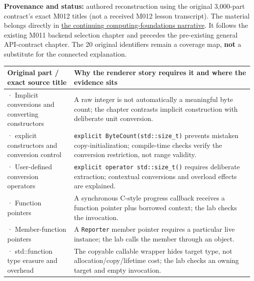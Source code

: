 \textbf{Provenance and status:} authored reconstruction using the original 3,000-part contract's exact M012 titles (not a received M012 lesson transcript). The material belongs directly in \hyperref[01-foundations-i-ch004-from-an-accepted-render-request-to-a-resource-that-survives-failures-and-callbacks]{the continuing computing-foundations narrative}. It follows the existing M011 backend selection chapter and precedes the pre-existing general API-contract chapter. The 20 original identifiers remain a coverage map, \textbf{not} a substitute for the connected explanation.

{\def\LTcaptype{none} %
\begin{longtable}[]{@{}
  >{\raggedright\arraybackslash}p{}
  >{\raggedright\arraybackslash}p{}@{}}
\toprule\noalign{}
\begin{minipage}[b]{\linewidth}\raggedright
Original part / exact source title
\end{minipage} & \begin{minipage}[b]{\linewidth}\raggedright
Why the renderer story requires it and where the evidence sits
\end{minipage} \\
\midrule\noalign{}
\endhead
\bottomrule\noalign{}
\endlastfoot
181 · Implicit conversions and converting constructors & A raw integer is not automatically a meaningful byte count; the chapter contrasts implicit construction with deliberate unit conversion. \\
182 · explicit constructors and conversion control & \texttt{explicit\ ByteCount(std::size\_t)} prevents mistaken copy-initialization; compile-time checks verify the conversion restriction, not range validity. \\
183 · User-defined conversion operators & \texttt{explicit\ operator\ std::size\_t()} requires deliberate extraction; contextual conversions and overload effects are explained. \\
184 · Function pointers & A synchronous C-style progress callback receives a function pointer plus borrowed context; the lab checks the invocation. \\
185 · Member-function pointers & A \texttt{Reporter} member pointer requires a particular live instance; the lab calls the member through an object. \\
186 · std::function type erasure and overhead & The copyable callable wrapper hides target type, not allocation/copy/lifetime cost; the lab checks an owning target and empty invocation. \\

\end{longtable}}

